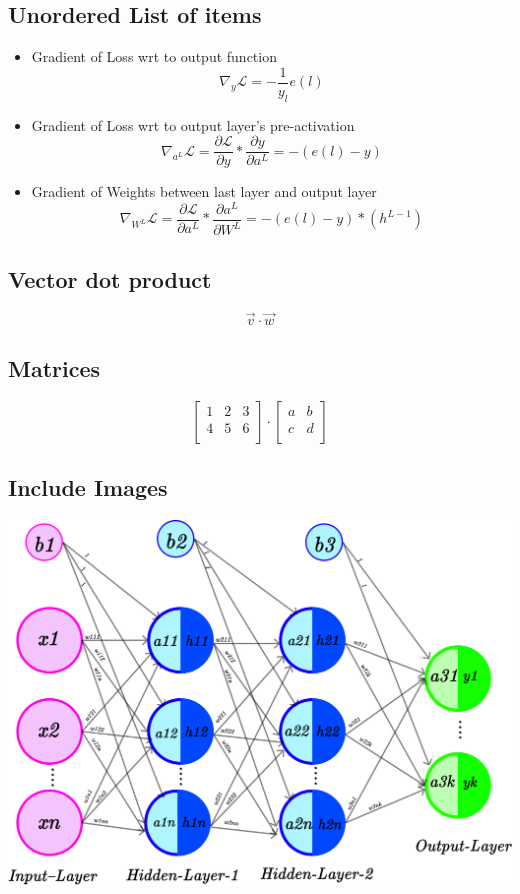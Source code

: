 \documentclass{article}
\begin{document}
\subsection{Unordered List of items}
\begin{itemize}


\item Gradient of Loss wrt to output function
$$\nabla_{y}\mathcal{L}=-\frac{1}{y_l}e(l)$$

\item Gradient of Loss wrt to output layer's pre-activation 
$$\nabla_{a^{L}}\mathcal{L}=\frac{\partial\mathcal{L}}{\partial{y}}*\frac{\partial y}{\partial{a^{L}}}=-(e(l)-y)$$

\item Gradient of Weights between last layer and output layer
$$\nabla_{W^{L}}\mathcal{L}=\frac{\partial\mathcal{L}}{\partial{a^{L}}}*\frac{\partial a^{L}}{\partial{W^{L}}}=-(e(l)-y)*(h^{L-1})$$

\end{itemize}

\subsection{Vector dot product}
$$\vec{v}\cdot\vec{w}$$

\subsection{Matrices}

$$
\begin{bmatrix}
1&2&3\\
4&5&6\\
\end{bmatrix}\cdot
\begin{bmatrix}
	a&b\\
	c&d\\
\end{bmatrix}
$$

\subsection{Include Images}
\includegraphics[scale=0.2]{ANN.png}

	
\end{document}
